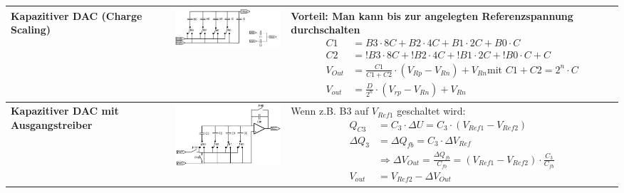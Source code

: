 \begin{longtable}{|p{3cm}|c|p{8.6cm}|}
	\\ \hline
	\textbf{Kapazitiver DAC (Charge Scaling)}
	& \includegraphics[width=6cm, valign=t]{./pictures/kapazitiverDAC.png}
	& { \textbf{ Vorteil:} Man kann bis zur angelegten Referenzspannung durchschalten \newline
        \begin{align*}
		C1	&= B3 \cdot 8C+B2 \cdot 4C+ B1 \cdot 2C+B0 \cdot C \\
		C2	&= !B3 \cdot 8C+!B2 \cdot 4C+ !B1 \cdot 2C+!B0 \cdot C+C \\
		V_{Out}& =\frac{C1}{C1+C2}\cdot (V_{Rp}-V_{Rn}) + V_{Rn} \textrm{mit } C1+C2=2^n\cdot C\\
		V_{out} &= \frac{D}{2^n} \cdot \left(V_{rp}-{V_{Rn}}\right) + V_{Rn}
	  \end{align*}}
	\\ \hline
    \textbf{Kapazitiver DAC mit Ausgangstreiber}
    & \includegraphics[width=6cm, valign=t]{./pictures/kapazitiverDACmitAmp.png}
    & {Wenn z.B. B3 auf $V_{Ref1}$ geschaltet wird:\newline
      \begin{align*}
          Q_{C3} &= C_3 \cdot \Delta U = C_3 \cdot (V_{Ref1}-V_{Ref2})\\
          \Delta Q_3 &= \Delta Q_{fb} = C_3 \cdot \Delta V_{Ref}\\
          &\Rightarrow \Delta V_{Out} = \frac{\Delta Q_{fb}}{C_{fb}} = (V_{Ref1}-V_{Ref2}) \cdot \frac{C_3}{C_{fb}} \\
          V_{out} &= V_{Ref2}-\Delta V_{Out} 
      \end{align*}}
    \\ \hline
\end{longtable}

